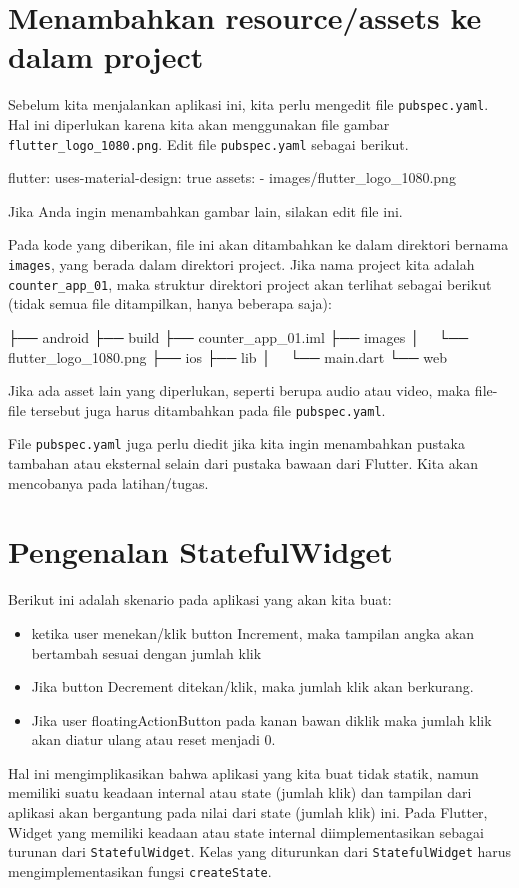 \documentclass[a4paper,11pt]{article} %
\newcommand{\txtinline}[1]{\texttt{#1}}
\begin{document}
\section{Menambahkan resource/assets ke dalam project}

Sebelum kita menjalankan aplikasi ini, kita perlu mengedit file
\txtinline{pubspec.yaml}. Hal ini diperlukan karena kita akan menggunakan
file gambar \txtinline{flutter_logo_1080.png}.
Edit file \txtinline{pubspec.yaml} sebagai berikut.
\begin{textcode}
  flutter:
  uses-material-design: true
  assets:
    - images/flutter_logo_1080.png
\end{textcode}
Jika Anda ingin menambahkan gambar lain, silakan edit file ini.

Pada kode yang diberikan, file ini akan ditambahkan ke dalam
direktori bernama \txtinline{images}, yang berada dalam direktori project.
Jika nama project kita adalah \txtinline{counter_app_01}, maka struktur
direktori project akan terlihat sebagai berikut (tidak semua file ditampilkan,
hanya beberapa saja):
\begin{textcode}
  ├── android
  ├── build
  ├── counter_app_01.iml
  ├── images
  │   └── flutter_logo_1080.png
  ├── ios
  ├── lib
  │   └── main.dart
  └── web
\end{textcode}

Jika ada asset lain yang diperlukan, seperti berupa audio atau video, maka
file-file tersebut juga harus ditambahkan pada file
\txtinline{pubspec.yaml}.

File \txtinline{pubspec.yaml} juga perlu diedit jika kita ingin menambahkan
pustaka tambahan atau eksternal selain dari pustaka bawaan dari Flutter.
Kita akan mencobanya pada latihan/tugas.


\section{Pengenalan StatefulWidget}

Berikut ini adalah skenario pada aplikasi yang akan kita buat:
\begin{itemize}
\item ketika user menekan/klik button Increment, maka
tampilan angka akan bertambah sesuai dengan jumlah klik
\item Jika button Decrement ditekan/klik, maka jumlah klik akan berkurang.
\item Jika user floatingActionButton pada kanan bawan diklik maka
jumlah klik akan diatur ulang atau reset menjadi 0.
\end{itemize}
Hal ini mengimplikasikan bahwa aplikasi yang kita buat tidak statik, namun
memiliki suatu keadaan internal atau state (jumlah klik) dan tampilan dari
aplikasi akan bergantung pada nilai dari state (jumlah klik) ini.
Pada Flutter, Widget yang memiliki keadaan atau state internal diimplementasikan
sebagai turunan dari \txtinline{StatefulWidget}.
Kelas yang diturunkan dari \txtinline{StatefulWidget} harus mengimplementasikan
fungsi \txtinline{createState}.
\end{document}
